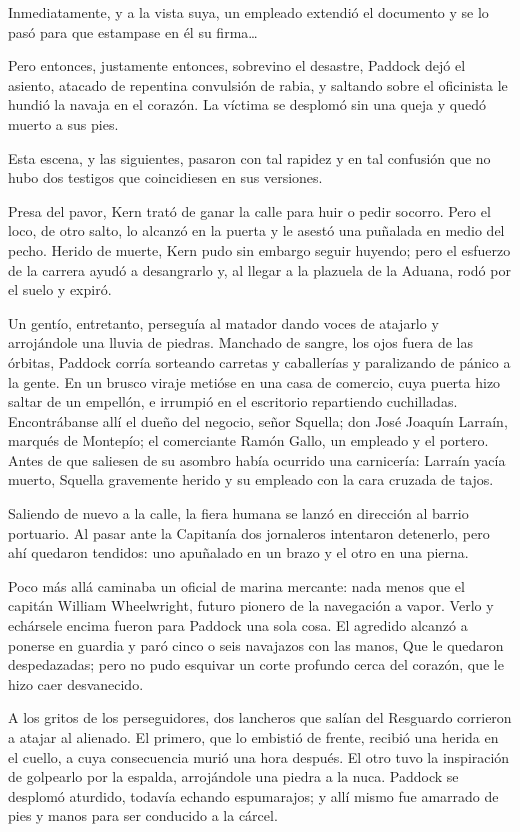 \documentclass[10pt,twoside,openright]{memoir}
\begin{document}
Inmediatamente, y a la vista suya, un empleado extendió el documento y
se lo pasó para que estampase en él su firma\ldots

Pero entonces, justamente entonces, sobrevino el desastre, Paddock dejó
el asiento, atacado de repentina convulsión de rabia, y saltando sobre
el oficinista le hundió la navaja en el corazón. La víctima se desplomó
sin una queja y quedó muerto a sus pies.

Esta escena, y las siguientes, pasaron con tal rapidez y en tal
confusión que no hubo dos testigos que coincidiesen en sus versiones.

Presa del pavor, Kern trató de ganar
la calle para huir o pedir socorro. Pero el loco, de otro salto, lo
alcanzó en la puerta y le asestó una puñalada en medio del pecho. Herido
de muerte, Kern pudo sin embargo seguir huyendo; pero el esfuerzo de la
carrera ayudó a desangrarlo y, al llegar a la plazuela de la Aduana,
rodó por el suelo y expiró.

Un gentío, entretanto, perseguía al matador dando voces de atajarlo y
arrojándole una lluvia de piedras. Manchado de sangre, los ojos fuera de
las órbitas, Paddock corría
sorteando carretas y caballerías y paralizando de pánico a la gente. En
un brusco viraje metióse en una casa de comercio, cuya puerta hizo
saltar de un empellón, e irrumpió en el escritorio repartiendo
cuchilladas. Encontrábanse allí el dueño del negocio, señor Squella; don
José Joaquín Larraín, marqués de Montepío; el comerciante Ramón Gallo,
un empleado y el portero. Antes de que
saliesen de su asombro había
ocurrido una carnicería: Larraín yacía muerto, Squella gravemente herido
y su empleado con la cara cruzada de tajos.

Saliendo de nuevo a la calle, la fiera humana se lanzó en dirección al
barrio portuario. Al pasar ante la Capitanía dos jornaleros intentaron
detenerlo, pero ahí quedaron tendidos: uno apuñalado en un brazo y el
otro en una pierna.

Poco más allá caminaba un oficial de marina mercante: nada menos que el
capitán William Wheelwright, futuro pionero de la navegación a vapor.
Verlo y echársele encima fueron para Paddock una sola cosa. El agredido
alcanzó a ponerse en guardia y paró cinco o seis navajazos con las
manos, Que le quedaron despedazadas; pero no pudo esquivar un corte
profundo cerca del corazón, que le hizo caer desvanecido.

A los gritos de los perseguidores, dos lancheros que salían del Resguardo corrieron
a atajar al alienado. El primero, que lo embistió de frente, recibió una
herida en el cuello, a cuya consecuencia murió una hora después. El otro
tuvo la inspiración de golpearlo por la espalda, arrojándole una piedra
a la nuca. Paddock se desplomó aturdido, todavía echando espumarajos; y
allí mismo fue amarrado de pies y manos para ser conducido a la cárcel.
\end{document}
